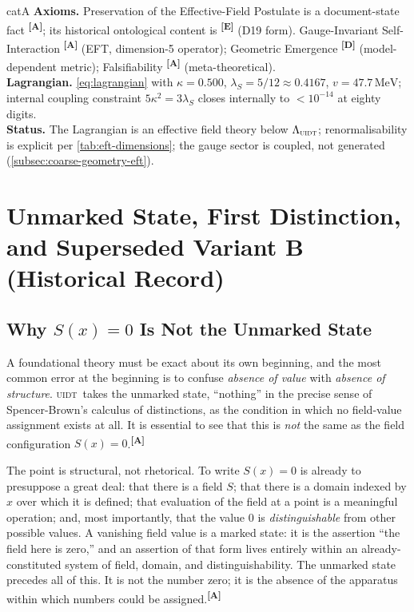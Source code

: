 \documentclass[12pt,a4paper,twoside]{article}
\theoremstyle{plain}
\theoremstyle{definition}
\theoremstyle{remark}
\newcommand{\UIDT}{\textsc{uidt}} %
\newcommand{\MeV}{\,\mathrm{MeV}}
\newcommand{\catmark}[1]{\textsuperscript{\textsf{\textbf{[#1]}}}}
\newcommand{\lambdaS}{5/12 \approx 0.4167} %
\newcommand{\kappaVal}{0.500} %
\newcommand{\vVEV}{47.7\MeV} %
\begin{document}
\begin{evidencebox}{catA}
\textbf{Axioms.} Preservation of the Effective-Field Postulate is a
document-state fact \catmark{A}; its historical ontological content is
\catmark{E} (D19 form). Gauge-Invariant Self-Interaction \catmark{A} (EFT, dimension-5
operator); Geometric Emergence \catmark{D} (model-dependent metric);
Falsifiability \catmark{A} (meta-theoretical).\\[0.3em]
\textbf{Lagrangian.} \cref{eq:lagrangian} with $\kappa=\kappaVal$,
$\lambda_S=\lambdaS$, $v=\vVEV$; internal coupling constraint
$5\kappa^2=3\lambda_S$ closes internally to $<10^{-14}$ at eighty
digits.\\[0.3em]
\textbf{Status.} The Lagrangian is an effective field theory below
$\Lambda_{\UIDT}$; renormalisability is explicit per
\cref{tab:eft-dimensions}; the gauge sector is coupled, not generated
(\cref{subsec:coarse-geometry-eft}).
\end{evidencebox}

\section{Unmarked State, First Distinction, and Superseded Variant B (Historical Record)}
\label{sec:unmarked-distinction-sx}

\subsection{Why \texorpdfstring{$S(x)=0$}{S(x)=0} Is Not the Unmarked State}
\label{subsec:sx-zero-not-unmarked}

A foundational theory must be exact about its own beginning, and the
most common error at the beginning is to confuse \emph{absence of value}
with \emph{absence of structure}. \UIDT\ takes the unmarked state,
``nothing'' in the precise sense of Spencer-Brown's calculus of
distinctions, as the condition in which no field-value assignment exists
at all. It is essential to see that this is \emph{not} the same as the
field configuration $S(x) = 0$.\catmark{A}

The point is structural, not rhetorical. To write $S(x) = 0$ is already
to presuppose a great deal: that there is a field $S$; that there is a
domain indexed by $x$ over which it is defined; that evaluation of the
field at a point is a meaningful operation; and, most importantly, that
the value $0$ is \emph{distinguishable} from other possible values. A
vanishing field value is a marked state: it is the assertion ``the field
here is zero,'' and an assertion of that form lives entirely within an
already-constituted system of field, domain, and distinguishability. The
unmarked state precedes all of this. It is not the number zero; it is
the absence of the apparatus within which numbers could be
assigned.\catmark{A}
\end{document}
